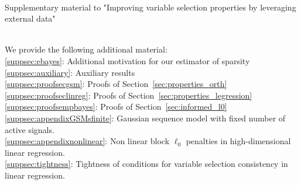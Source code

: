 \documentclass[bj,authoryear]{imsart}
\theoremstyle{plain}
\begin{document}


\newpage
\hspace{0.2cm}\\
\begin{center}
    \Large{Supplementary material to "Improving variable selection properties by leveraging external data"}
\end{center}

\renewcommand*\thesection{S\arabic{section}}
\renewcommand*{\theHsection}{S\arabic{section}}
\setcounter{section}{-1}
\renewcommand{\theequation}{S\arabic{equation}}
\renewcommand{\thetable}{S\arabic{table}}
\hspace{0.2cm}\\
We provide the following additional material:\\
\noindent\ref{suppsec:ebayes}: Additional motivation for our estimator of sparsity\\
\ref{suppsec:auxiliary}: Auxiliary results\\
\ref{suppsec:proofsecgsm}: Proofs of Section~\ref{sec:properties_orth}\\
\ref{suppsec:proofseclinreg}: Proofs of Section~\ref{sec:properties_legression}\\
\ref{suppsec:proofsempbayes}: Proofs of Section~\ref{sec:informed_l0}\\
\ref{suppsec:appendixGSMsfinite}: Gaussian sequence model with fixed number of active signals.\\
\ref{suppsec:appendixnonlinear}: Non linear block $\ell_0$ penalties in high-dimensional linear regression.\\
\ref{suppsec:tightness}: Tightness of conditions for variable selection consistency in linear regression.
\end{document}
